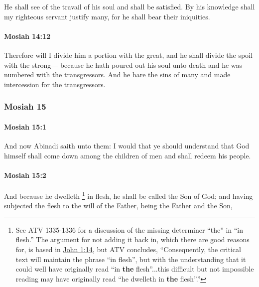 			He shall see of the travail of his soul and shall be satisfied.
			By his knowledge shall my righteous servant justify many,
			for he shall bear their iniquities.

		\paragraph{Mosiah 14:12} %
			\label{MOSIAH-14-12}

			Therefore will I divide him a portion with the great,
			and he shall divide the spoil with the strong---
			because he hath poured out his soul unto death
			and he was numbered with the transgressors.
			And he bare the sins of many
			and made intercession for the transgressors.
			
	\subsubsection{Mosiah 15} %
		\label{MOSIAH-15}
		
		\paragraph{Mosiah 15:1} %
			\label{MOSIAH-15-1}

			And now Abinadi saith unto them:
			I would that ye should understand
			that God himself shall come down among the children of men
			and shall redeem his people.

		\paragraph{Mosiah 15:2} %
			\label{MOSIAH-15-2}

			And because he dwelleth
				\footnote{%
					See ATV 1335-1336 for a discussion of the missing determiner ``the'' in ``in flesh.'' The argument for not adding it back in, which there are good reasons for, is based in \hyperref[JOHN-1-14]{John 1:14}, but ATV concludes, ``Consequently, the critical text will maintain the phrase ``in flesh'', but with the understanding that it could well have originally read ``in \textbf{the} flesh''...this difficult but not impossible reading may have originally read ``he dwelleth in \textbf{the} flesh''.''
					}%
			in flesh,
			he shall be called the Son of God;
			and having subjected the flesh to the will of the Father,
			being the Father and the Son,

